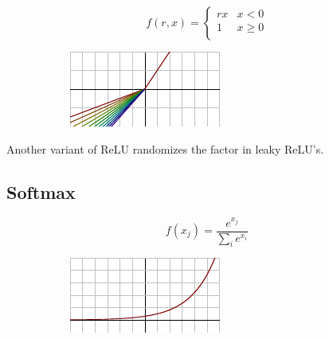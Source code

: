 \begin{figure}[H]
\raggedright
\begin{subfigure}{.35\textwidth}
  \centering
  \[
f(r, x) = \begin{cases}
       rx & x < 0 \\
       1 & x \geq 0 \\
     \end{cases} \] 
\end{subfigure}%
\begin{subfigure}{.25\textwidth}
  \centering
  \includegraphics[width=\textwidth]{tex/images/activation/rlrelu}
\end{subfigure}
\end{figure}

\noindent
Another variant of ReLU randomizes the factor in leaky ReLU's.

\subsection*{Softmax}

\begin{figure}[H]
\raggedright
\begin{subfigure}{.25\textwidth}
  \centering
  \[ f(x_j) = \frac{e^{x_j}}{\sum_i e^{x_i}} \]
\end{subfigure}%
\begin{subfigure}{.25\textwidth}
  \centering
  \includegraphics[width=\textwidth]{tex/images/activation/softmax}
\end{subfigure}
\end{figure}

